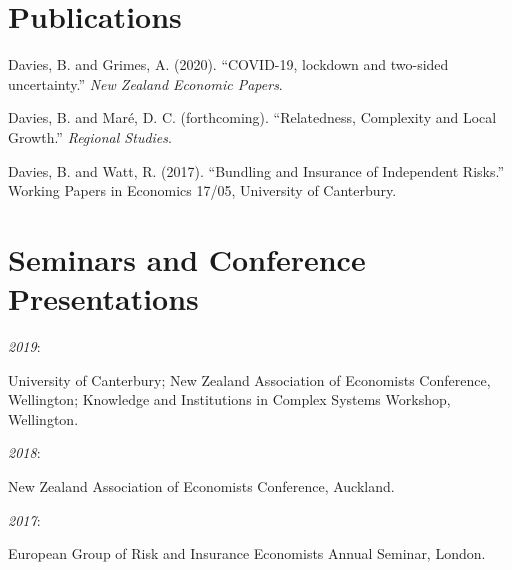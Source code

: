 \documentclass[11pt,oneside]{memoir}
\newcommand{\entry}[1]{\par\hangindent=0.4in #1}
\begin{document}
	\section{Publications}
	
		\entry{Davies, B. and Grimes, A. (2020). ``COVID-19, lockdown and two-sided uncertainty.'' \emph{New Zealand Economic Papers}.}
		\entry{Davies, B. and Maré, D. C. (forthcoming). ``Relatedness, Complexity and Local Growth.'' \emph{Regional Studies}.}
		\entry{Davies, B. and Watt, R. (2017). ``Bundling and Insurance of Independent Risks.'' Working Papers in Economics 17/05, University of Canterbury.}
	
	\section{Seminars and Conference Presentations}
	
		\entry{\parbox[b]{0.4in}{\emph{2019}: }University of Canterbury; New Zealand Association of Economists Conference, Wellington; Knowledge and Institutions in Complex Systems Workshop, Wellington.}
		\entry{\parbox[b]{0.4in}{\emph{2018}: }New Zealand Association of Economists Conference, Auckland.}
		\entry{\parbox[b]{0.4in}{\emph{2017}: }European Group of Risk and Insurance Economists Annual Seminar, London.}
\end{document}
